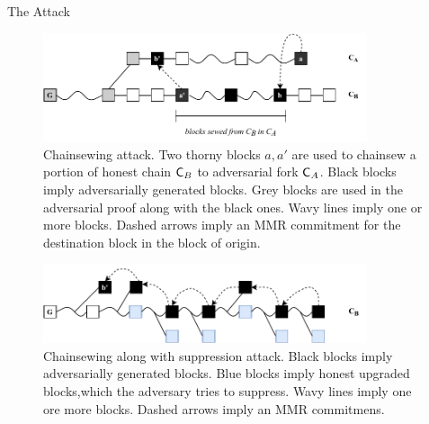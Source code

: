 \begin{section}{The Attack}
	\begin{figure}[h!]
		\begin{center}
			\includegraphics[width=0.85\textwidth]{figures/simple_chainsewing_flyclient.pdf}
		\end{center}
		\caption{Chainsewing attack. Two thorny blocks $a, a'$ are used to chainsew a portion of honest chain $\mathsf{C}_B$ to adversarial fork $\mathsf{C}_A$. Black blocks imply adversarially generated blocks. Grey blocks are used in the adversarial proof along with the black ones. Wavy lines imply one or more blocks. Dashed arrows imply an MMR commitment for the destination block in the block of origin.}
		\label{fig:simple_chainsewing_flyclient}
	\end{figure}

	\begin{figure}[h!]
		\begin{center}
			\includegraphics[width=0.85\textwidth]{figures/flyclient_attack_suppression.pdf}
		\end{center}
		\caption{Chainsewing along with suppression attack. Black blocks imply adversarially generated blocks. Blue blocks imply honest upgraded blocks,which the adversary tries to suppress. Wavy lines imply one ore more blocks. Dashed arrows imply an MMR commitmens.}
		\label{fig:combined_chainsewing_flyclient}
	\end{figure}

\end{section}